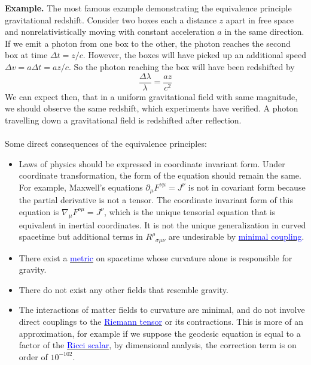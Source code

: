 \documentclass[11pt]{article}
\newcommand{\bluelink}[2]{\hyperref[#1]{\textcolor{blue}{#2}}}
\begin{document}
\noindent \textbf{Example.} The most famous example demonstrating the equivalence principle gravitational redshift. Consider two boxes each a distance \(z\) apart in free space and nonrelativistically moving with constant acceleration \(a\) in the same direction. If we emit a 
photon from one box to the other, the photon reaches the second box at time \(\Delta t = z / c\). However, the boxes will have picked up an additional speed \(\Delta v = a \Delta t = az/c\). So the photon reaching the box will have been redshifted by
\[
    \frac{\Delta\lambda}{\lambda} = \frac{az}{c^2}
\]
We can expect then, that in a uniform gravitational field with same magnitude, we should observe the same redshift, which experiments have verified. A photon travelling down a gravitational field is redshifted after reflection.
\\
\\
\noindent Some direct consequences of the equivalence principles:
\begin{itemize}
    \item Laws of physics should be expressed in coordinate invariant form. Under coordinate transformation, the form of the equation should remain the same. For example, Maxwell's equations \(\partial_\mu F^{\nu\mu} = J^{\nu}\) is not in covariant form because the
    partial derivative is not a tensor. The coordinate invariant form of this equation is \(\nabla_{\mu}F^{\nu\mu} = J^{\nu}\), which is the unique tensorial equation that is equivalent in inertial coordinates. It is not the unique generalization in curved spacetime
    but additional terms in \(R^\rho{}_{\sigma\mu\nu}\) are  undesirable by \bluelink{Minimal Coupling}{minimal coupling}.

    \item There exist a \bluelink{metric}{metric} on spacetime whose curvature alone is responsible for gravity.
    
    \item There do not exist any other fields that resemble gravity.

    \item The interactions of matter fields to curvature are minimal, and do not involve direct couplings to the \bluelink{Riemann}{Riemann tensor} or its contractions. This is more of an approximation, for example if we suppose the geodesic equation is equal to a factor of the \bluelink{Ricci}{Ricci scalar},
    by dimensional analysis, the correction term is on order of \(10^{-102}\).
\end{itemize}
\end{document}
